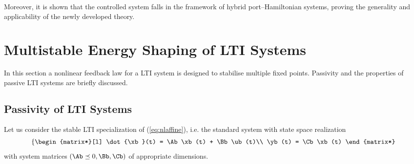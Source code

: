 Moreover, it is shown that the controlled system falls in the framework of hybrid port--Hamiltonian systems, proving the generality and applicability of the newly developed theory.
%

\clearpage

\section{Multistable Energy Shaping of LTI Systems}\label{sec:multistable}
%
In this section a nonlinear feedback law for a LTI system is designed to stabilise multiple fixed points. Passivity and the properties of passive LTI systems are briefly discussed.
\subsection{Passivity of LTI Systems}
%
Let us consider the stable LTI specialization of (\ref{eq:nlaffine}), i.e. the standard system with state space realization
%
\begin{equation}\label{eq:lsys}
\left\{
\begin{matrix*}[l]
\dot{\xb}(t) = \Ab\xb(t) + \Bb\ub(t)\\
\yb(t) = \Cb\xb(t)
\end{matrix*}
\right.
\end{equation}
with system matrices $(\Ab\preceq 0,\Bb,\Cb)$ of appropriate dimensions.
%
